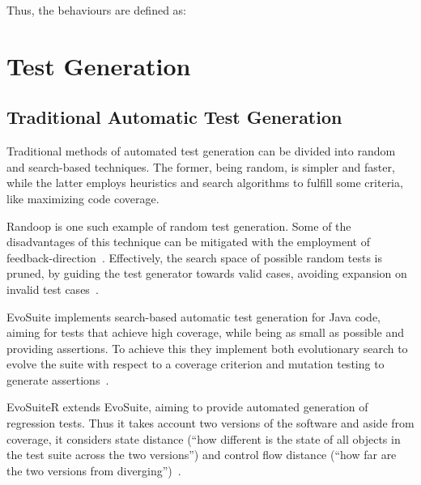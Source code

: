 Thus, the behaviours are defined as:




\section{Test Generation}

\subsection{Traditional Automatic Test Generation}

Traditional methods of automated test generation can be divided into random and search-based techniques. The former, being random, is simpler and faster, while the latter employs heuristics and search algorithms to fulfill some criteria, like maximizing code coverage.

Randoop is one such example of random test generation. Some of the disadvantages of this technique can be mitigated with the employment of feedback-direction~\cite{kn:randoop}. Effectively, the search space of possible random tests is pruned, by guiding the test generator towards valid cases, avoiding expansion on invalid test cases~\cite{kn:randoop}.

EvoSuite implements search-based automatic test generation for Java code, aiming for tests that achieve high coverage, while being as small as possible and providing assertions. To achieve this they implement both evolutionary search to evolve the suite with respect to a coverage criterion and mutation testing to generate assertions~\cite{kn:evosuite}.

EvoSuiteR extends EvoSuite, aiming to provide automated generation of regression tests. Thus it takes account two versions of the software and aside from coverage, it considers state distance (``how different is the state of
all objects in the test suite across the two versions'') and control flow distance (``how
far are the two versions from diverging'')~\cite{kn:evosuiter}.

